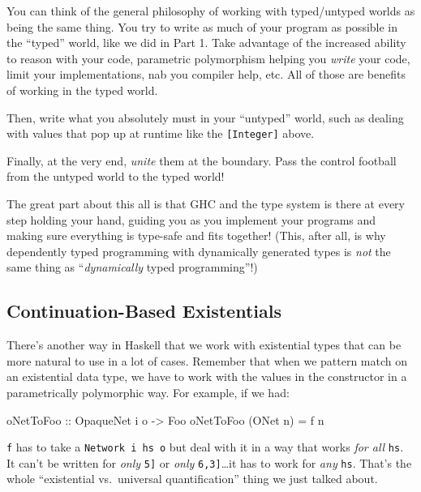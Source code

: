 \documentclass[]{article}
\newenvironment{Shaded}{}{}
\newcommand{\DataTypeTok}[1]{\textcolor[rgb]{0.56,0.13,0.00}{#1}}
\newcommand{\NormalTok}[1]{#1}
\newcommand{\OtherTok}[1]{\textcolor[rgb]{0.00,0.44,0.13}{#1}}
\begin{document}
You can think of the general philosophy of working with typed/untyped worlds as
being the same thing. You try to write as much of your program as possible in
the ``typed'' world, like we did in Part 1. Take advantage of the increased
ability to reason with your code, parametric polymorphism helping you
\emph{write} your code, limit your implementations, nab you compiler help, etc.
All of those are benefits of working in the typed world.

Then, write what you absolutely must in your ``untyped'' world, such as dealing
with values that pop up at runtime like the \texttt{{[}Integer{]}} above.

Finally, at the very end, \emph{unite} them at the boundary. Pass the control
football from the untyped world to the typed world!

The great part about this all is that GHC and the type system is there at every
step holding your hand, guiding you as you implement your programs and making
sure everything is type-safe and fits together! (This, after all, is why
dependently typed programming with dynamically generated types is \emph{not} the
same thing as ``\emph{dynamically} typed programming''!)

\subsection{Continuation-Based
Existentials}\label{continuation-based-existentials}

There's another way in Haskell that we work with existential types that can be
more natural to use in a lot of cases. Remember that when we pattern match on an
existential data type, we have to work with the values in the constructor in a
parametrically polymorphic way. For example, if we had:

\begin{Shaded}
\begin{Highlighting}[]
\OtherTok{oNetToFoo ::} \DataTypeTok{OpaqueNet}\NormalTok{ i o }\OtherTok{{-}\textgreater{}} \DataTypeTok{Foo}
\NormalTok{oNetToFoo (}\DataTypeTok{ONet}\NormalTok{ n) }\OtherTok{=}\NormalTok{ f n}
\end{Highlighting}
\end{Shaded}

\texttt{f} has to take a \texttt{Network\ i\ hs\ o} but deal with it in a way
that works \emph{for all} \texttt{hs}. It can't be written for \emph{only}
\texttt{\textquotesingle{}{[}5{]}} or \emph{only}
\texttt{\textquotesingle{}{[}6,3{]}}\ldots it has to work for \emph{any}
\texttt{hs}. That's the whole ``existential vs.~universal quantification'' thing
we just talked about.
\end{document}

